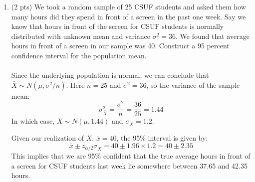 \documentclass{./../../Latex/handout}
\begin{document}
\begin{enumerate}
\item (2 pts) We took a random sample of 25 CSUF students and asked them how many hours did they spend in front of a screen in the past one week. Say we know that hours in front of the screen for CSUF students is normally distributed with unknown mean and variance $\sigma^2 = 36$.  We found that average hours in front of a screen in our sample was 40. Construct a 95 percent confidence interval for the population mean. \\~\\
Since the underlying population is normal, we can conclude that $\bar{X} \sim N(\mu, \sigma^2/n)$. Here $n=25$ and $\sigma^2=36$, so the variance of the sample mean:$$\sigma^2_{\bar{X}} = \frac{\sigma^2}{n} = \frac{36}{25} = 1.44 $$
In which case, $\bar{X} \sim N(\mu, 1.44)$ and $\sigma_{\bar{X}}=1.2$.

Given our realization of $\bar{X}$, $\bar{x} = 40$, the 95\% interval is given by: 
$$ \bar{x} \pm z_{\alpha/2} \sigma_{\bar{X}} = 40 \pm 1.96 \times 1.2 = 40 \pm 2.35  $$
This implies that we are 95\% confident that the true average hours in front of a screen for CSUF students last week lie somewhere between 37.65 and 42.35 hours.  
\end{enumerate}
\end{document}
